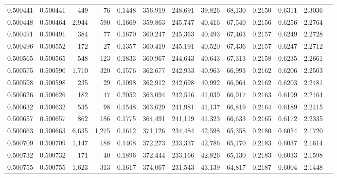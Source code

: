 \begin{tabular}{rrrrrrrrrrrrr}
0.500441 & 0.500441 &   449 &    76 &                                     0.1448 & 356,919 & 248,691 &  39,826 &  68,130 & 0.2150 & 0.6311 & 2.3036 \\
0.500448 & 0.500464 & 2,944 &   590 &                                     0.1669 & 359,863 & 245,747 &  40,416 &  67,540 & 0.2156 & 0.6256 & 2.2764 \\
0.500491 & 0.500491 &   384 &    77 &                                     0.1670 & 360,247 & 245,363 &  40,493 &  67,463 & 0.2157 & 0.6249 & 2.2728 \\
0.500496 & 0.500552 &   172 &    27 &                                     0.1357 & 360,419 & 245,191 &  40,520 &  67,436 & 0.2157 & 0.6247 & 2.2712 \\
0.500565 & 0.500565 &   548 &   123 &                                     0.1833 & 360,967 & 244,643 &  40,643 &  67,313 & 0.2158 & 0.6235 & 2.2661 \\
0.500575 & 0.500590 & 1,710 &   320 &                                     0.1576 & 362,677 & 242,933 &  40,963 &  66,993 & 0.2162 & 0.6206 & 2.2503 \\
0.500598 & 0.500598 &   235 &    29 &                                     0.1098 & 362,912 & 242,698 &  40,992 &  66,964 & 0.2162 & 0.6203 & 2.2481 \\
0.500626 & 0.500626 &   182 &    47 &                                     0.2052 & 363,094 & 242,516 &  41,039 &  66,917 & 0.2163 & 0.6199 & 2.2464 \\
0.500632 & 0.500632 &   535 &    98 &                                     0.1548 & 363,629 & 241,981 &  41,137 &  66,819 & 0.2164 & 0.6189 & 2.2415 \\
0.500657 & 0.500657 &   862 &   186 &                                     0.1775 & 364,491 & 241,119 &  41,323 &  66,633 & 0.2165 & 0.6172 & 2.2335 \\
0.500663 & 0.500663 & 6,635 & 1,275 &                                     0.1612 & 371,126 & 234,484 &  42,598 &  65,358 & 0.2180 & 0.6054 & 2.1720 \\
0.500709 & 0.500709 & 1,147 &   188 &                                     0.1408 & 372,273 & 233,337 &  42,786 &  65,170 & 0.2183 & 0.6037 & 2.1614 \\
0.500732 & 0.500732 &   171 &    40 &                                     0.1896 & 372,444 & 233,166 &  42,826 &  65,130 & 0.2183 & 0.6033 & 2.1598 \\
0.500755 & 0.500755 & 1,623 &   313 &                                     0.1617 & 374,067 & 231,543 &  43,139 &  64,817 & 0.2187 & 0.6004 & 2.1448 \\

\end{tabular}
